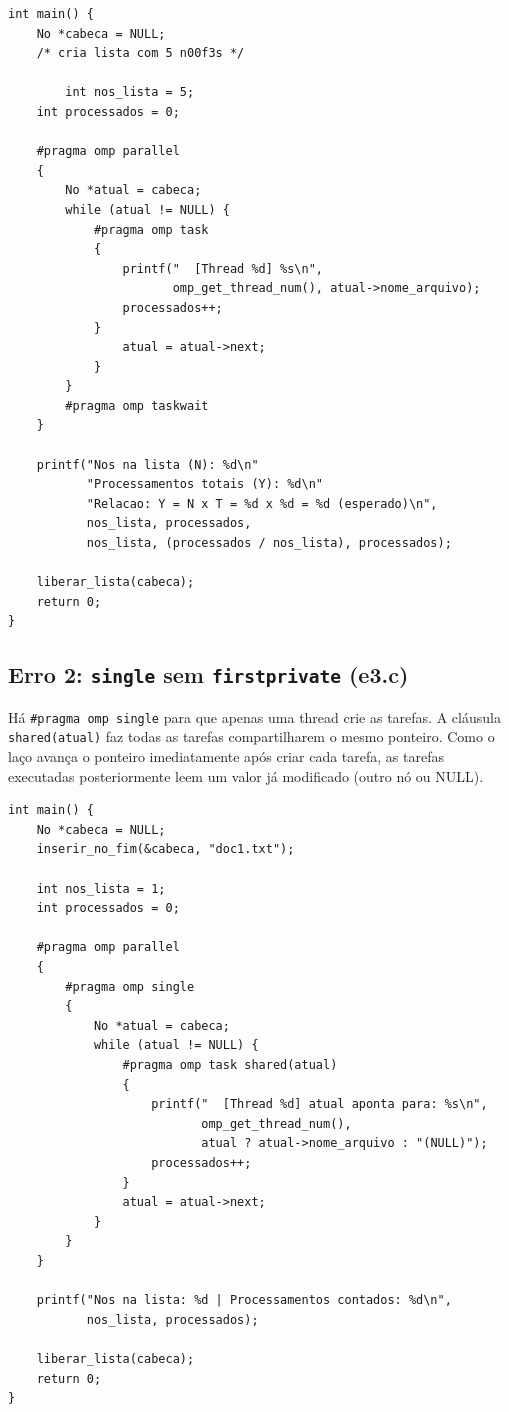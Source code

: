 \documentclass[11pt,letterpaper]{article}
\begin{document}
\begin{lstlisting}[caption={main() de e2.c, parallel sem single}]
int main() {
    No *cabeca = NULL;
    /* cria lista com 5 n00f3s */

        int nos_lista = 5;
    int processados = 0;

    #pragma omp parallel
    {
        No *atual = cabeca;
        while (atual != NULL) {
            #pragma omp task
            {
                printf("  [Thread %d] %s\n",
                       omp_get_thread_num(), atual->nome_arquivo);
                processados++;
            }
                atual = atual->next;
            }
        }
        #pragma omp taskwait
    }

    printf("Nos na lista (N): %d\n"
           "Processamentos totais (Y): %d\n"
           "Relacao: Y = N x T = %d x %d = %d (esperado)\n",
           nos_lista, processados,
           nos_lista, (processados / nos_lista), processados);

    liberar_lista(cabeca);
    return 0;
}
\end{lstlisting}

\subsection{Erro 2: \texttt{single} sem \texttt{firstprivate} (e3.c)}
Há \texttt{\#pragma omp single} para que apenas uma thread crie as tarefas. A cláusula \texttt{shared(atual)} faz todas as tarefas compartilharem o mesmo ponteiro. Como o laço avança o ponteiro imediatamente após criar cada tarefa, as tarefas executadas posteriormente leem um valor já modificado (outro nó ou NULL).

\begin{lstlisting}[caption={main() de e3.c, single + shared}]
int main() {
    No *cabeca = NULL;
    inserir_no_fim(&cabeca, "doc1.txt");

    int nos_lista = 1;
    int processados = 0;

    #pragma omp parallel
    {
        #pragma omp single
        {
            No *atual = cabeca;
            while (atual != NULL) {
                #pragma omp task shared(atual)
                {
                    printf("  [Thread %d] atual aponta para: %s\n",
                           omp_get_thread_num(),
                           atual ? atual->nome_arquivo : "(NULL)");
                    processados++;
                }
                atual = atual->next;
            }
        }
    }

    printf("Nos na lista: %d | Processamentos contados: %d\n",
           nos_lista, processados);

    liberar_lista(cabeca);
    return 0;
}
\end{lstlisting}
\end{document}
